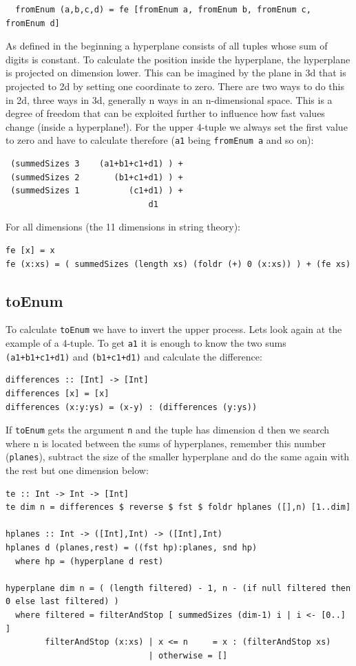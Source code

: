 \documentclass{tmr}
\begin{document}
\begin{Verbatim}
  fromEnum (a,b,c,d) = fe [fromEnum a, fromEnum b, fromEnum c, fromEnum d]
\end{Verbatim}

As defined in the beginning a hyperplane consists of all tuples whose sum of digits is constant. To calculate the position inside the hyperplane, the hyperplane is projected on dimension lower. This can be imagined by the plane in 3d that is projected to 2d by setting one coordinate to zero. There are two ways to do this in 2d, three ways in 3d, generally n ways in an n-dimensional space. This is a degree of freedom that can be exploited further to influence how fast values change (inside a hyperplane!).
For the upper 4-tuple we always set the first value to zero and have to calculate therefore (\verb|a1| being \verb|fromEnum a| and so on):

\begin{Verbatim}
 (summedSizes 3    (a1+b1+c1+d1) ) +
 (summedSizes 2       (b1+c1+d1) ) +
 (summedSizes 1          (c1+d1) ) +
                             d1
\end{Verbatim}

For all dimensions (\eg the 11 dimensions in string theory):
\begin{Verbatim}
fe [x] = x
fe (x:xs) = ( summedSizes (length xs) (foldr (+) 0 (x:xs)) ) + (fe xs)
\end{Verbatim}

\subsection {toEnum }
To calculate \verb|toEnum| we have to invert the upper process. Lets look again at the example of a 4-tuple. To get \verb|a1| it is enough to know the two sums \verb|(a1+b1+c1+d1)| and \verb|(b1+c1+d1)| and calculate the difference:

\begin{Verbatim}
differences :: [Int] -> [Int]
differences [x] = [x]
differences (x:y:ys) = (x-y) : (differences (y:ys))
\end{Verbatim}

If \verb|toEnum| gets the argument \verb|n| and the tuple has dimension d then we search where n is located between the sums of hyperplanes, remember this number (\verb|planes|), subtract the size of the smaller hyperplane and do the same again with the rest but one dimension below:

\begin{Verbatim}
te :: Int -> Int -> [Int]
te dim n = differences $ reverse $ fst $ foldr hplanes ([],n) [1..dim]

hplanes :: Int -> ([Int],Int) -> ([Int],Int)
hplanes d (planes,rest) = ((fst hp):planes, snd hp)
  where hp = (hyperplane d rest)

hyperplane dim n = ( (length filtered) - 1, n - (if null filtered then 0 else last filtered) )
  where filtered = filterAndStop [ summedSizes (dim-1) i | i <- [0..] ]
        filterAndStop (x:xs) | x <= n     = x : (filterAndStop xs)
                             | otherwise = []
\end{Verbatim}
\end{document}
